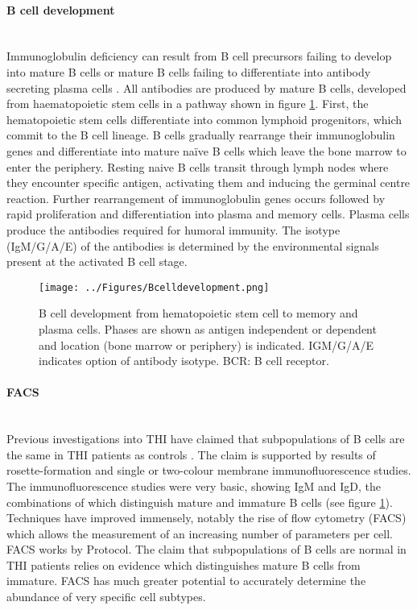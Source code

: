 \documentclass[12pt]{article}
\newcommand{\naive}{na\"{i}ve }
\begin{document}
		\paragraph{B cell development}
			~\\
			Immunoglobulin deficiency can result from B cell precursors failing to develop into mature B cells or mature B cells failing to differentiate into antibody secreting plasma cells \citep{Fiorilli86}. 
			All antibodies are produced by mature B cells, developed from haematopoietic stem cells in a pathway shown in figure \ref{fig:BCellDevelopment}.
			First, the hematopoietic stem cells differentiate into common lymphoid progenitors, which commit to the B cell lineage.
			B cells gradually rearrange their immunoglobulin genes and differentiate into mature \naive B cells which leave the bone marrow to enter the periphery. 
			Resting naive B cells transit through lymph nodes where they encounter specific antigen, activating them and inducing the germinal centre reaction. 
			Further rearrangement of immunoglobulin genes occurs followed by rapid proliferation and differentiation into plasma and memory cells. 
			Plasma cells produce the antibodies required for humoral immunity. 
			The isotype (IgM/G/A/E) of the antibodies is determined by the environmental signals present at the activated B cell stage. 
			
			
			\begin{figure}[tb]
				\centering
				\texttt{[image: ../Figures/Bcelldevelopment.png]}
				\caption{B cell development from hematopoietic stem cell to memory and plasma cells. Phases are shown as antigen independent or dependent and location (bone marrow or periphery) is indicated. IGM/G/A/E indicates option of antibody isotype. BCR: B cell receptor.}
				\label{fig:BCellDevelopment}
			\end{figure}
	
		\paragraph{FACS}
			~\\
			Previous investigations into THI have claimed that subpopulations of B cells are the same in THI patients as controls \citep{Tiller78,Stiemh80,Siegel81,Buckley83,Fiorilli86,Dressler89}. 
			The claim is supported by results of rosette-formation and single or two-colour membrane immunofluorescence studies. 
			The immunofluorescence studies were very basic, showing IgM and IgD, the combinations of which distinguish mature and immature B cells (see figure \ref{fig:BCellDevelopment}).
			Techniques have improved immensely, notably the rise of flow cytometry (FACS) which allows the measurement of an increasing number of parameters per cell.
			FACS works by {\Huge Protocol}. 
			The claim that subpopulations of B cells are normal in THI patients relies on evidence which distinguishes mature B cells from immature. 
			FACS has much greater potential to accurately determine the abundance of very specific cell subtypes.
\end{document}
